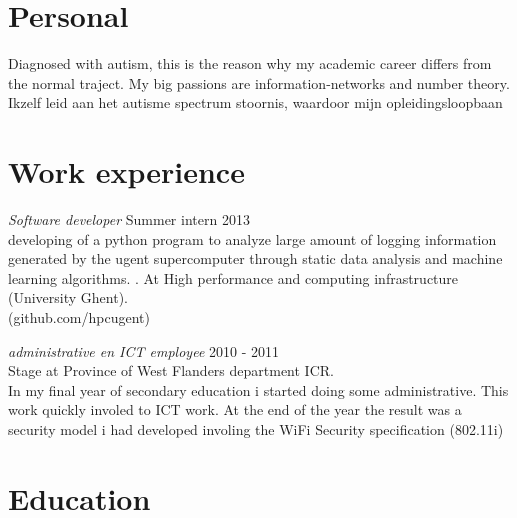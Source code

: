 \documentclass[margin, 10pt]{res} %
\begin{document}
\begin{resume}

 
\section{Personal}
Diagnosed with autism, this is the reason why my academic career differs from the normal traject. My big passions are information-networks and number theory.
Ikzelf leid aan het autisme spectrum stoornis, waardoor mijn opleidingsloopbaan 

\section{Work experience}
{\sl Software developer} \hfill Summer intern 2013 \\

developing of a python program to analyze large amount of logging information generated by the ugent supercomputer through static data analysis and machine learning algorithms.
.
At High performance and computing infrastructure (University Ghent).\\ (github.com/hpcugent)

{\sl administrative en ICT employee} \hfill 2010 - 2011 \\
Stage at Province of West Flanders department ICR. \\
In my final year of secondary education i started doing some administrative. This work quickly involed to ICT work. At the end of the year the result was a security model i had developed involing the WiFi Security specification (802.11i)


\section{Education}


\end{resume}
\end{document}

